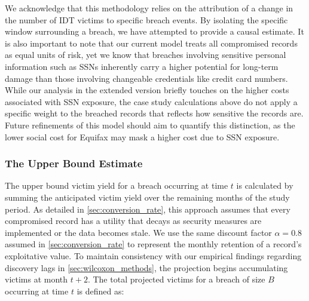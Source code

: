 


We acknowledge that this methodology relies on the attribution of a change in the number of IDT victims to specific breach events. By isolating the specific window surrounding a breach, we have attempted to provide a  causal estimate. It is also important to note that our current model treats all compromised records as equal units of risk, yet we know that breaches involving sensitive personal information such as SSNs inherently carry a higher potential for long-term damage than those involving changeable credentials like credit card numbers. While our analysis in the extended version \cite{Anonymous2026SocialCostExtended} briefly touches on the higher costs associated with SSN exposure, the case study calculations above do not apply a specific weight to the breached records that reflects how sensitive the records are. Future refinements of this model should aim to quantify this distinction, as the lower social cost for Equifax may mask a higher cost due to SSN exposure.


\subsubsection{The Upper Bound Estimate}
The upper bound victim yield for a breach occurring at time $t$ is calculated by summing the anticipated victim yield over the remaining months of the study period. As detailed in \ref{sec:conversion_rate}, this approach assumes that every compromised record has a utility that decays as security measures are implemented or the data becomes stale. We use the same discount factor $\alpha = 0.8$ assumed in \ref{sec:conversion_rate} to represent the monthly retention of a record's exploitative value. To maintain consistency with our empirical findings regarding discovery lags in \ref{sec:wilcoxon_methods}, the projection begins accumulating victims at month $t+2$. The total projected victims for a breach of size $B$ occurring at time $t$ is defined as: 

